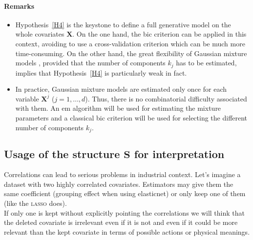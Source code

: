 \documentclass[12pt,a4paper]{report}
\begin{document}
	
\paragraph{Remarks}\begin{itemize}
	\item Hypothesis~\ref{H4} is the keystone to define a full generative model on the whole covariates $\boldsymbol{X}$. On the one hand, the {\sc bic} criterion can be applied in this context, avoiding to use a cross-validation criterion which can be much more time-consuming. On the other hand, the great flexibility  of Gaussian mixture models \cite{mclachlan2004finite}, provided that the number of components $k_j$ has to be estimated, implies that Hypothesis~\ref{H4} is particularly weak in fact.
\item In practice, Gaussian mixture models are estimated only once for each variable $\boldsymbol{X}^j$ ($j=1,\ldots,d$). Thus, there is no combinatorial difficulty associated with them. An {\sc em} algorithm \cite{dempster1977maximum} will be used for estimating the mixture parameters and a classical {\sc bic} criterion \cite{Sch1978} will be used for selecting the different number of components $k_j$.
\end{itemize}	
	
	
	
	\subsection{Usage of the structure $\boldsymbol{S}$ for interpretation}
		
	
	Correlations can lead to serious problems in industrial context. Let's imagine a dataset with two highly correlated covariates. Estimators may give them the same coefficient (grouping effect when using elasticnet) or only keep one of them (like the \textsc{lasso} does). \\
	
	If only one is kept without explicitly pointing the correlations we will think that the deleted covariate is irrelevant even if it is not and even if it could be more relevant than the kept covariate in terms of possible actions or physical meanings.\\
	
\end{document}

